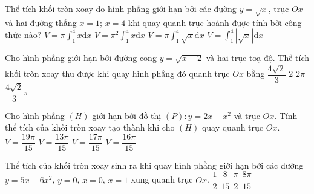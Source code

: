 \begin{ex}%
	Thể tích khối tròn xoay do hình phẳng giới hạn  bởi các đường $y=\sqrt{x}$, trục $Ox$ và hai đường thẳng $x=1$;
	$x=4$ khi quay quanh trục hoành được tính bởi công thức  nào?
	\choice 
		{\True $V=\pi  \displaystyle\int_1^4x\mathrm{d}x$}
		 {$V=\pi ^2\displaystyle\int_1^4x\mathrm{d}x$}
		{$V=\pi \displaystyle\int_1^4\sqrt{x} \mathrm{d}x$} 
		 {$V=\displaystyle\int_1^4\left|\sqrt{x} \right|\mathrm{d}x$}
\end{ex}

\begin{ex}%
	Cho hình phẳng giới hạn bởi đường cong $y=\sqrt{x+2}$ và hai trục toạ độ. Thể tích khối tròn xoay  thu được khi quay hình phẳng đó quanh trục $Ox$ bằng
	\choice 
		 {$\dfrac{4\sqrt{2}}{3}$}
		{$2$} 
		 {\True $2\pi$}
		{$\dfrac{4\sqrt{2}}{3} \pi$} 
	 \loigiai{
		\[V=\pi  \displaystyle\int_{-2}^0\left(\sqrt{x+2} \right)^2\mathrm{d}x=\left. \pi \left(x^2+2x\right)\right|_{-2}^0=2\pi.\]
	 }
\end{ex}

\begin{ex}%
	Cho hình phẳng $(H)$ giới hạn bởi đồ thị $(P)\colon y=2x-x^2$ và trục $Ox$. Tính thể tích của khối tròn xoay tạo  thành khi cho $(H)$ quay quanh trục $Ox$.
	 \choice
		 {$V=\dfrac{19\pi}{15}$}
		{$V=\dfrac{13\pi}{15}$} 
		{$V=\dfrac{17\pi}{15}$} 
		 {\True $V=\dfrac{16\pi}{15}$}
\end{ex}

\begin{ex}%
	Thể tích của khối tròn xoay sinh ra khi quay hình phẳng giới hạn bởi các đường $y=5x-6x^2$, $y=0$, $x=0$,  $x=1$ xung quanh trục $Ox$.
	 \choice
		{$\dfrac{1}{2}$} 
		{$\dfrac{8}{15}$} 
		{$\dfrac{\pi}{2}$} 
		{\True $\dfrac{8\pi}{15}$} 
\end{ex}

